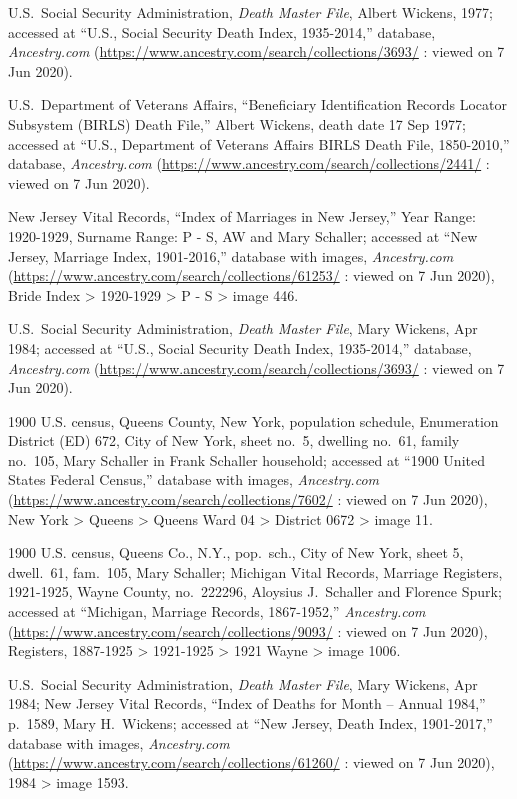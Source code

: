\begin{thebibliography}{999}
U.S.\ Social Security Administration, \textit{Death Master File}, Albert Wickens, 1977; accessed at ``U.S., Social Security Death Index, 1935-2014,'' database, \textit{Ancestry.com} (\url{https://www.ancestry.com/search/collections/3693/} : viewed on 7 Jun 2020).

U.S.\ Department of Veterans Affairs, ``Beneficiary Identification Records Locator Subsystem (BIRLS) Death File,'' Albert Wickens, death date 17 Sep 1977; accessed at ``U.S., Department of Veterans Affairs BIRLS Death File, 1850-2010,'' database, \textit{Ancestry.com} (\url{https://www.ancestry.com/search/collections/2441/} : viewed on 7 Jun 2020).

New Jersey Vital Records, ``Index of Marriages in New Jersey,'' Year Range: 1920-1929, Surname Range: P - S, AW and Mary Schaller; accessed at ``New Jersey, Marriage Index, 1901-2016,'' database with images, \textit{Ancestry.com} (\url{https://www.ancestry.com/search/collections/61253/} : viewed on 7 Jun 2020), Bride Index > 1920-1929 > P - S > image 446.

U.S.\ Social Security Administration, \textit{Death Master File}, Mary Wickens, Apr 1984; accessed at ``U.S., Social Security Death Index, 1935-2014,'' database, \textit{Ancestry.com} (\url{https://www.ancestry.com/search/collections/3693/} : viewed on 7 Jun 2020).

1900 U.S. census, Queens County, New York, population schedule, Enumeration District (ED) 672, City of New York, sheet no.\ 5, dwelling no.\ 61, family no.\ 105, Mary Schaller in Frank Schaller household; accessed at ``1900 United States Federal Census,'' database with images, \textit{Ancestry.com} (\url{https://www.ancestry.com/search/collections/7602/} : viewed on 7 Jun 2020), New York > Queens > Queens Ward 04 > District 0672 > image 11.

1900 U.S. census, Queens Co., N.Y., pop.\ sch., City of New York, sheet 5, dwell.\ 61, fam.\ 105, Mary Schaller; Michigan Vital Records, Marriage Registers, 1921-1925, Wayne County, no.\ 222296, Aloysius J.\ Schaller and Florence Spurk; accessed at ``Michigan, Marriage Records, 1867-1952,'' \textit{Ancestry.com} (\url{https://www.ancestry.com/search/collections/9093/} : viewed on 7 Jun 2020), Registers, 1887-1925 > 1921-1925 > 1921 Wayne > image 1006.

U.S.\ Social Security Administration, \textit{Death Master File}, Mary Wickens, Apr 1984; New Jersey Vital Records, ``Index of Deaths for Month -- Annual 1984,'' p.\ 1589, Mary H.\ Wickens; accessed at ``New Jersey, Death Index, 1901-2017,'' database with images, \textit{Ancestry.com} (\url{https://www.ancestry.com/search/collections/61260/} : viewed on 7 Jun 2020), 1984 > image 1593.


\end{thebibliography}
